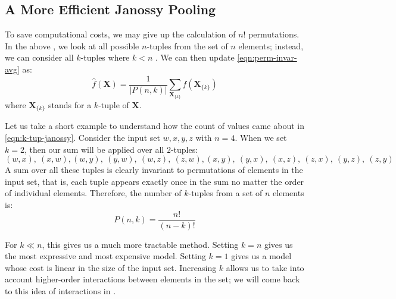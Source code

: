 \subsection{A More Efficient Janossy Pooling}\label{ssec:efficient-janossy}

To save computational costs, we may give up the calculation of $n!$ permutations. In the above , we look at all possible $n$-tuples from the set of $n$ elements; instead, we can consider all $k$-tuples where $k \less n$ \parencite{Murphy2018}. We can then update \cref{eqn:perm-invar-avg} as:
\begin{equation}
    \label{eqn:k-tup-janossy}
    \widehat{f}(\symbf{X}) = \frac{1}{|P(n, k)|} \sum_{\symbf{X}_{\{k\}}} f(\symbf{X}_{\{k\}})
\end{equation}
where $\symbf{X}_{\{k\}}$ stands for a $k$-tuple of $\symbf{X}$.

Let us take a short example to understand how the count of values came about in \cref{eqn:k-tup-janossy}. Consider the input set ${w, x, y, z}$ with $n=4$. When we set $k=2$, then our sum will be applied over all $2$-tuples:
\[(w, x),~(x, w),(w, y),~(y, w),~(w, z),~(z, w),
(x, y),~(y, x),~(x, z),~(z, x),~(y, z),~(z, y)
\]
A sum over all these tuples is clearly invariant to permutations of elements in the input set, that is, each tuple appears exactly once in the sum no matter the order of individual elements. Therefore, the number of $k$-tuples from a set of $n$ elements is:
\begin{equation}
\label{eqn:k-tup-cnt}
    P(n,k) = \frac{n!}{(n-k)!}
\end{equation}

For $k \ll n$, this gives us a much more tractable method. Setting $k=n$ gives us the most expressive and most expensive model. Setting $k=1$ gives us a model whose cost is linear in the size of the input set. Increasing $k$ allows us to take into account higher-order interactions between elements in the set; we will come back to this idea of interactions in .

